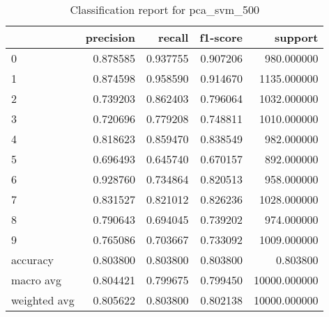\begin{table}[htb!]
\centering
\caption{Classification report for pca_svm_500}
\label{tab:classification-report-pca_svm_500}
\begin{tabular}{lrrrr}
\toprule
 & precision & recall & f1-score & support \\
\midrule
0 & 0.878585 & 0.937755 & 0.907206 & 980.000000 \\
1 & 0.874598 & 0.958590 & 0.914670 & 1135.000000 \\
2 & 0.739203 & 0.862403 & 0.796064 & 1032.000000 \\
3 & 0.720696 & 0.779208 & 0.748811 & 1010.000000 \\
4 & 0.818623 & 0.859470 & 0.838549 & 982.000000 \\
5 & 0.696493 & 0.645740 & 0.670157 & 892.000000 \\
6 & 0.928760 & 0.734864 & 0.820513 & 958.000000 \\
7 & 0.831527 & 0.821012 & 0.826236 & 1028.000000 \\
8 & 0.790643 & 0.694045 & 0.739202 & 974.000000 \\
9 & 0.765086 & 0.703667 & 0.733092 & 1009.000000 \\
accuracy & 0.803800 & 0.803800 & 0.803800 & 0.803800 \\
macro avg & 0.804421 & 0.799675 & 0.799450 & 10000.000000 \\
weighted avg & 0.805622 & 0.803800 & 0.802138 & 10000.000000 \\
\bottomrule
\end{tabular}
\end{table}
